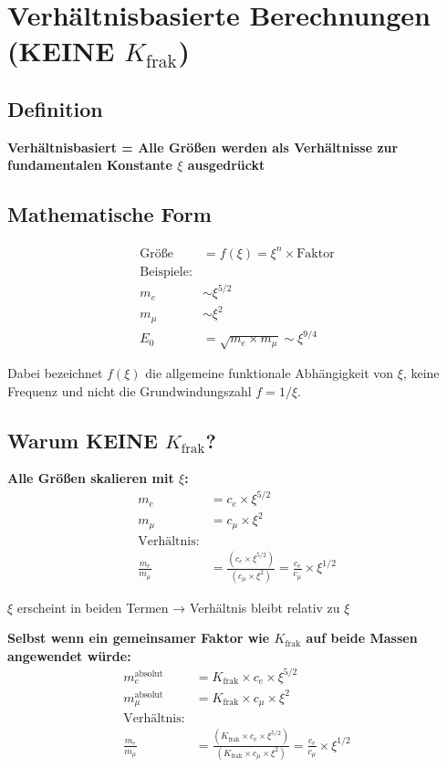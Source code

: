 	\section{Verhältnisbasierte Berechnungen (KEINE $K_{\text{frak}}$)}
	
	\subsection{Definition}
	
	\textbf{Verhältnisbasiert = Alle Größen werden als Verhältnisse zur fundamentalen Konstante $\xi$ ausgedrückt}
	
	\subsection{Mathematische Form}
	\begin{align*}
		\text{Größe} &= f(\xi) = \xi^n \times \text{Faktor} \\
		\text{Beispiele:} & \\
		m_e &\sim \xi^{5/2} \\
		m_μ &\sim \xi^2 \\
		E_0 &= \sqrt{m_e \times m_μ} \sim \xi^{9/4}
	\end{align*}

Dabei bezeichnet $f(\xi)$ die allgemeine funktionale Abhängigkeit von $\xi$, keine Frequenz und nicht die Grundwindungszahl $f = 1/\xi$.

	\subsection{Warum KEINE $K_{\text{frak}}$?}
	
	\textbf{Alle Größen skalieren mit $\xi$:}
	\begin{align*}
		m_e &= c_e \times \xi^{5/2} \\
		m_μ &= c_μ \times \xi^2 \\
		\text{Verhältnis:} & \\
		\frac{m_e}{m_μ} &= \frac{(c_e \times \xi^{5/2})}{(c_μ \times \xi^2)} = \frac{c_e}{c_μ} \times \xi^{1/2}
	\end{align*}
	
	$\xi$ erscheint in beiden Termen → Verhältnis bleibt relativ zu $\xi$
	
	\textbf{Selbst wenn ein gemeinsamer Faktor wie $K_{\text{frak}}$ auf beide Massen angewendet würde:}
	\begin{align*}
		m_e^{\text{absolut}} &= K_{\text{frak}} \times c_e \times \xi^{5/2} \\
		m_μ^{\text{absolut}} &= K_{\text{frak}} \times c_μ \times \xi^2 \\
		\text{Verhältnis:} & \\
		\frac{m_e}{m_μ} &= \frac{(K_{\text{frak}} \times c_e \times \xi^{5/2})}{(K_{\text{frak}} \times c_μ \times \xi^2)} = \frac{c_e}{c_μ} \times \xi^{1/2}
	\end{align*}
	
